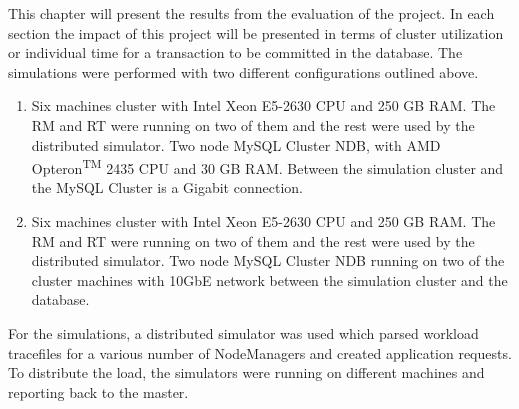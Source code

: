This chapter will present the results from the evaluation
of the project. In each section the impact of this project will be
presented in terms of cluster utilization or individual time
for a transaction to be committed in the database. The simulations were
performed with two different configurations outlined above.

\begin{enumerate}
\item Six machines cluster with Intel\textsuperscript{\textregistered}
  Xeon \textsuperscript{\textregistered} E5-2630 CPU and 250 GB
  RAM. The RM and RT were running on two of them and the rest were
  used by the distributed simulator. Two node MySQL Cluster NDB, with
  AMD Opteron\textsuperscript{TM} 2435 CPU and 30 GB RAM. Between the
  simulation cluster and the MySQL Cluster is a Gigabit connection.

\item Six machines cluster with Intel\textsuperscript{\textregistered}
  Xeon \textsuperscript{\textregistered} E5-2630 CPU and 250 GB
  RAM. The RM and RT were running on two of them and the rest were
  used by the distributed simulator. Two node MySQL Cluster NDB
  running on two of the cluster machines with 10GbE network between
  the simulation cluster and the database.

\end{enumerate}

For the simulations, a distributed simulator was used which parsed
workload tracefiles for a various number of NodeManagers and created
application requests. To distribute the load, the simulators were
running on different machines and reporting back to the master.